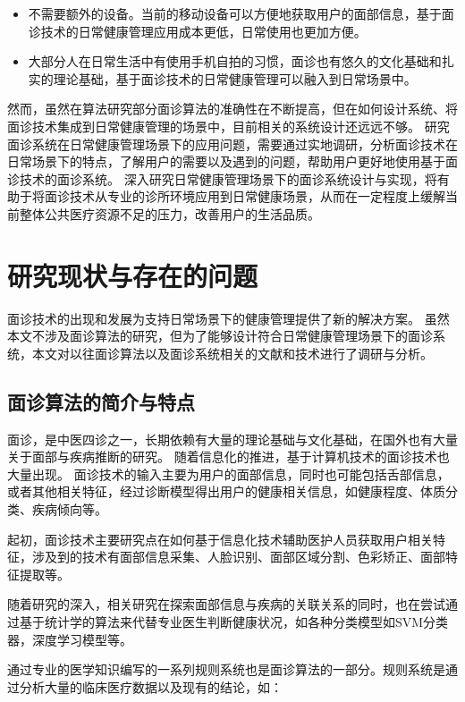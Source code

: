 \begin{itemize}
    \item 不需要额外的设备。当前的移动设备可以方便地获取用户的面部信息，基于面诊技术的日常健康管理应用成本更低，日常使用也更加方便。
    \item 大部分人在日常生活中有使用手机自拍的习惯，面诊也有悠久的文化基础和扎实的理论基础，基于面诊技术的日常健康管理可以融入到日常场景中。
\end{itemize}

然而，虽然在算法研究部分面诊算法的准确性在不断提高，但在如何设计系统、将面诊技术集成到日常健康管理的场景中，目前相关的系统设计还远远不够。
研究面诊系统在日常健康管理场景下的应用问题，需要通过实地调研，分析面诊技术在日常场景下的特点，了解用户的需要以及遇到的问题，帮助用户更好地使用基于面诊技术的面诊系统。
深入研究日常健康管理场景下的面诊系统设计与实现，将有助于将面诊技术从专业的诊所环境应用到日常健康场景，从而在一定程度上缓解当前整体公共医疗资源不足的压力，改善用户的生活品质。

\section{研究现状与存在的问题}

面诊技术的出现和发展为支持日常场景下的健康管理提供了新的解决方案。
虽然本文不涉及面诊算法的研究，但为了能够设计符合日常健康管理场景下的面诊系统，本文对以往面诊算法以及面诊系统相关的文献和技术进行了调研与分析。

\subsection{面诊算法的简介与特点}

面诊，是中医四诊之一，长期依赖有大量的理论基础与文化基础，在国外也有大量关于面部与疾病推断的研究。
随着信息化的推进，基于计算机技术的面诊技术也大量出现。
面诊技术的输入主要为用户的面部信息，同时也可能包括舌部信息，或者其他相关特征，经过诊断模型得出用户的健康相关信息，如健康程度、体质分类、疾病倾向等。

起初，面诊技术主要研究点在如何基于信息化技术辅助医护人员获取用户相关特征，涉及到的技术有面部信息采集、人脸识别、面部区域分割、色彩矫正、面部特征提取等。

随着研究的深入，相关研究在探索面部信息与疾病的关联关系的同时，也在尝试通过基于统计学的算法来代替专业医生判断健康状况，如各种分类模型如SVM分类器，深度学习模型等。

通过专业的医学知识编写的一系列规则系统也是面诊算法的一部分。规则系统是通过分析大量的临床医疗数据以及现有的结论，如：

